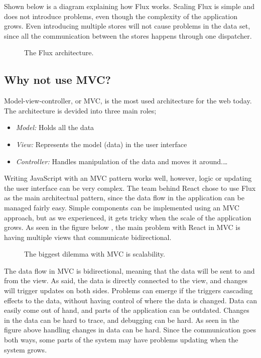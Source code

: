 Shown below is a diagram explaining how Flux works. Scaling Flux is simple and does not introduce problems, even though the complexity of the application grows. Even introducing multiple stores will not cause problems in the data set, since all the communication between the stores happens through one dispatcher.

\begin{figure}[h]
\centering
\scalebox{0.8}{{}}
\caption{The Flux architecture.}
\end{figure}




\subsection{Why not use MVC?}

Model-view-controller, or MVC, is the most used architecture for the web today. The architecture is devided into three main roles;
\begin{itemize}  
\item \emph{Model:} Holds all the data
\item \emph{View:} Represents the model (data) in the user interface
\item \emph{Controller:} Handles manipulation of the data and moves it around.\ldots 
\end{itemize}

Writing JavaScript with an MVC pattern works well, however, logic or updating the user interface can be very complex. The team behind React chose to use Flux as the main architectual pattern, since the data flow in the application can be managed fairly easy. Simple components can be implemented using an MVC approach, but as we experienced, it gets tricky when the scale of the application grows. As seen in the figure below , the main problem with React in MVC is having multiple views that communicate bidirectional.

\begin{figure}[h]
\centering
\scalebox{1}{{}}
\caption{The biggest dilemma with MVC is scalability.}
\end{figure}

The data flow in MVC is bidirectional, meaning that the data will be sent to and from the view. As said, the data is directly connected to the view, and changes will trigger updates on both sides. Problems can emerge if the triggers cascading effects to the data, without having control of where the data is changed. Data can easily come out of hand, and parts of the application can be outdated. Changes in the data can be hard to trace, and debugging can be hard. As seen in the figure above  handling changes in data can be hard. Since the communication goes both ways, some parts of the system may have problems updating when the system grows.

